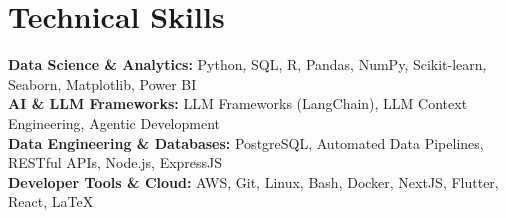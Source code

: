 \medskip

\resumeItemListStart
{}
\resumeItemListEnd
\resumeItemListEnd

\resumeSubHeadingListEnd

\section{Technical Skills}
\begin{itemize}[leftmargin=0.15in, label={}]
  \small{\item{
        \textbf{Data Science \& Analytics:} {Python, SQL, R, Pandas, NumPy, Scikit-learn, Seaborn, Matplotlib, Power BI} \\
        \textbf{AI \& LLM Frameworks:} {LLM Frameworks (LangChain), LLM Context Engineering, Agentic Development} \\
        \textbf{Data Engineering \& Databases:} {PostgreSQL, Automated Data Pipelines, RESTful APIs, Node.js, ExpressJS} \\
        \textbf{Developer Tools \& Cloud:} {AWS, Git, Linux, Bash, Docker, NextJS, Flutter, React, \LaTeX\EndAccSupp{}} \\
        }}
\end{itemize}
